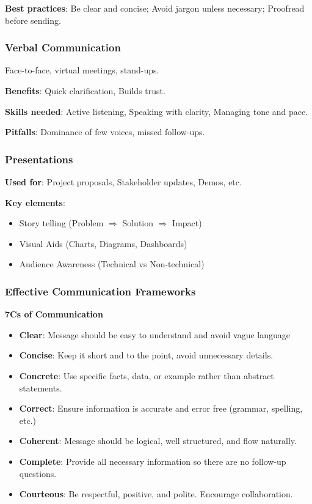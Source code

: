 \noindent\textbf{Best practices}: Be clear and concise; Avoid jargon unless necessary; Proofread before sending.

\subsubsection{Verbal Communication}

\indent 

Face-to-face, virtual meetings, stand-ups.

\noindent\textbf{Benefits}: Quick clarification, Builds trust.

\noindent\textbf{Skills needed}: Active listening, Speaking with clarity, Managing tone and pace.

\noindent\textbf{Pitfalls}: Dominance of few voices, missed follow-ups.

\subsubsection{Presentations}

\indent 

\noindent\textbf{Used for}: Project proposals, Stakeholder updates, Demos, etc.

\bigskip

\noindent\textbf{Key elements}:

\begin{itemize}
    \item Story telling (Problem $\Longrightarrow$ Solution $\Longrightarrow$ Impact)
    \item Visual Aids (Charts, Diagrams, Dashboards)
    \item Audience Awareness (Technical vs Non-technical)
\end{itemize}

\subsubsection{Effective Communication Frameworks}

\indent 

\noindent\textbf{7Cs of Communication}

\begin{itemize}
    \item \textbf{Clear}: Message should be easy to understand and avoid vague language
    \item \textbf{Concise}: Keep it short and to the point, avoid unnecessary details.
    \item \textbf{Concrete}: Use specific facts, data, or example rather than abstract statements.
    \item \textbf{Correct}: Ensure information is accurate and error free (grammar, spelling, etc.)
    \item \textbf{Coherent}: Message should be logical, well structured, and flow naturally.
    \item \textbf{Complete}: Provide all necessary information so there are no follow-up questions.
    \item \textbf{Courteous}: Be respectful, positive, and polite. Encourage collaboration.
\end{itemize}

